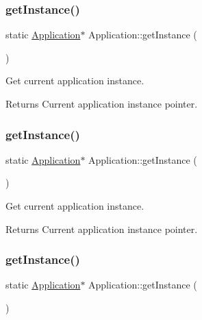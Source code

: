 \subsubsection{\texorpdfstring{get\+Instance()}{getInstance()}\hspace{0.1cm}{\footnotesize\ttfamily [10/12]}}
{\footnotesize\ttfamily static \hyperlink{classApplication}{Application}$\ast$ Application\+::get\+Instance (\begin{DoxyParamCaption}{ }\end{DoxyParamCaption})\hspace{0.3cm}{\ttfamily [static]}}



Get current application instance. 

\begin{DoxyReturn}{Returns}
Current application instance pointer. 
\end{DoxyReturn}
\mbox{\label{classApplication_ab5dba709d2e806d5d83c297bab6cdace}} 
\subsubsection{\texorpdfstring{get\+Instance()}{getInstance()}\hspace{0.1cm}{\footnotesize\ttfamily [11/12]}}
{\footnotesize\ttfamily static \hyperlink{classApplication}{Application}$\ast$ Application\+::get\+Instance (\begin{DoxyParamCaption}{ }\end{DoxyParamCaption})\hspace{0.3cm}{\ttfamily [static]}}



Get current application instance. 

\begin{DoxyReturn}{Returns}
Current application instance pointer. 
\end{DoxyReturn}
\mbox{\label{classApplication_ab5dba709d2e806d5d83c297bab6cdace}} 
\subsubsection{\texorpdfstring{get\+Instance()}{getInstance()}\hspace{0.1cm}{\footnotesize\ttfamily [12/12]}}
{\footnotesize\ttfamily static \hyperlink{classApplication}{Application}$\ast$ Application\+::get\+Instance (\begin{DoxyParamCaption}{ }\end{DoxyParamCaption})\hspace{0.3cm}{\ttfamily [static]}}



